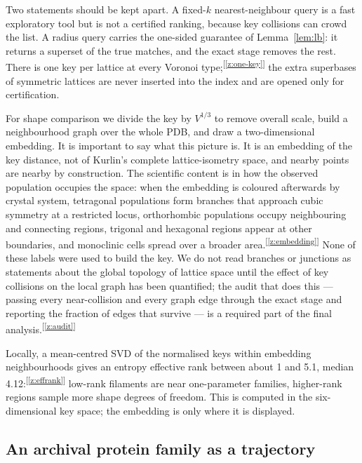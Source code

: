 \documentclass[11pt]{article}
\newcommand{\chk}[1]{\textsuperscript{[\ref{#1}]}}
\begin{document}
Two statements should be kept apart. A fixed-$k$ nearest-neighbour query is a fast exploratory tool but is not a certified ranking, because key collisions can crowd the list. A radius query carries the one-sided guarantee of Lemma~\ref{lem:lb}: it returns a superset of the true matches, and the exact stage removes the rest. There is one key per lattice at every Voronoi type;\chk{z:one-key} the extra superbases of symmetric lattices are never inserted into the index and are opened only for certification.

For shape comparison we divide the key by $V^{1/3}$ to remove overall scale, build a neighbourhood graph over the whole PDB, and draw a two-dimensional embedding. It is important to say what this picture is. It is an embedding of the key distance, not of Kurlin's complete lattice-isometry space, and nearby points are nearby by construction. The scientific content is in how the observed population occupies the space: when the embedding is coloured afterwards by crystal system, tetragonal populations form branches that approach cubic symmetry at a restricted locus, orthorhombic populations occupy neighbouring and connecting regions, trigonal and hexagonal regions appear at other boundaries, and monoclinic cells spread over a broader area.\chk{z:embedding} None of these labels were used to build the key. We do not read branches or junctions as statements about the global topology of lattice space until the effect of key collisions on the local graph has been quantified; the audit that does this --- passing every near-collision and every graph edge through the exact stage and reporting the fraction of edges that survive --- is a required part of the final analysis.\chk{z:audit}

Locally, a mean-centred SVD of the normalised keys within embedding neighbourhoods gives an entropy effective rank between about 1 and 5.1, median 4.12:\chk{z:effrank} low-rank filaments are near one-parameter families, higher-rank regions sample more shape degrees of freedom. This is computed in the six-dimensional key space; the embedding is only where it is displayed.


\subsection{An archival protein family as a trajectory}
\end{document}
